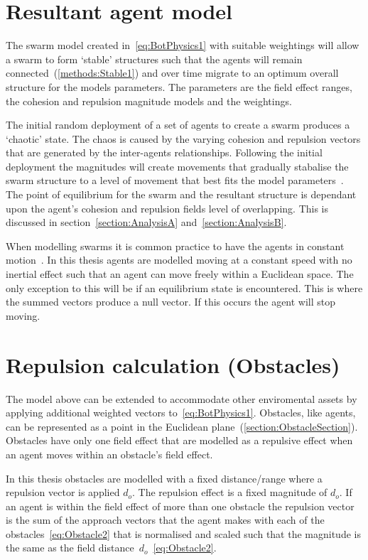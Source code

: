 \section{Resultant agent model}
The swarm model created in~\autoref{eq:BotPhysics1} with suitable weightings will allow a swarm to form `stable' structures such that the agents will remain connected~(\autoref{methods:Stable1}) and over time migrate to an optimum overall structure for the models parameters. The parameters are the field effect ranges, the cohesion and repulsion magnitude models and the weightings. 

The initial random deployment of a set of agents to create a swarm produces a `chaotic' state. The chaos is caused by the varying cohesion and repulsion vectors that are generated by the inter-agents relationships. Following the initial deployment the magnitudes will create movements that gradually stabalise the swarm structure to a level of movement that best fits the model parameters~\cite{PG:08, WF:12}. The point of equilibrium for the swarm and the resultant structure is dependant upon the agent's cohesion and repulsion fields level of overlapping. This is discussed in section~\autoref{section:AnalysisA} and~\autoref{section:AnalysisB}.

When modelling swarms it is common practice to have the agents in constant motion~\cite{LCW:07, GKF:13}. In this thesis agents are modelled moving at a constant speed with no inertial effect such that an agent can move freely within a Euclidean space. The only exception to this will be if an equilibrium state is encountered. This is where the summed vectors produce a null vector. If this occurs the agent will stop moving.

\section{Repulsion calculation (Obstacles)\label{section:ObstacleSection}}
The model above can be extended to accommodate other enviromental assets by applying additional weighted vectors to~\autoref{eq:BotPhysics1}. Obstacles, like agents, can be represented as a point in the Euclidean plane~(\autoref{section:ObstacleSection}). Obstacles have only one field effect that are modelled as a repulsive effect when an agent moves within an obstacle's field effect.

In this thesis obstacles are modelled with a fixed distance/range where a repulsion vector is applied $d_o$. The repulsion effect is a fixed magnitude of $d_o$. If an agent is within the field effect of more than one obstacle the repulsion vector is the sum of the approach vectors that the agent makes with each of the obstacles~\autoref{eq:Obstacle2} that is normalised and scaled such that the magnitude is the same as the field distance~$d_o$~\autoref{eq:Obstacle2}.

